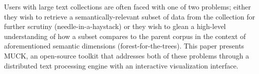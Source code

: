 Users with large text collections are often faced with one of two problems; either they wish to retrieve a semantically-relevant subset of data from the collection for further scrutiny (needle-in-a-haystack) or they wish to glean a high-level understanding of how a subset compares to the parent corpus in the context of aforementioned semantic dimensions (forest-for-the-trees).  This paper presents MUCK, an open-source toolkit that addresses both of these problems through a distributed text processing engine with an interactive visualization interface.
